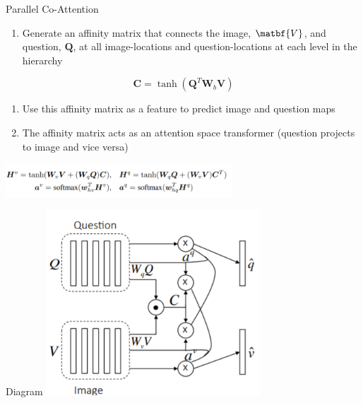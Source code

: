 \documentclass{beamer}
\begin{document}
\begin{frame}{Parallel Co-Attention}
\begin{enumerate}
    \item Generate an affinity matrix that connects the image, $\matbf{V}$, and question, $\mathbf{Q}$, at all image-locations and question-locations at each level in the hierarchy
\end{enumerate}

\begin{equation*}
    \mathbf{C} = \tanh(\mathbf{Q}^T\mathbf{W}_b\mathbf{V})
\end{equation*}

\begin{enumerate}[2]
    \item Use this affinity matrix as a feature to predict image and question maps 
    \item The affinity matrix acts as an attention space transformer (question projects to image and vice versa)
\end{enumerate}

\includegraphics[width=8.5cm]{Annotation 2020-02-09 153558.png}
\end{frame}

\begin{frame}{Diagram}
\includegraphics[width=8cm]{Annotation 2020-02-10 111151.png}
\end{frame}
\end{document}
